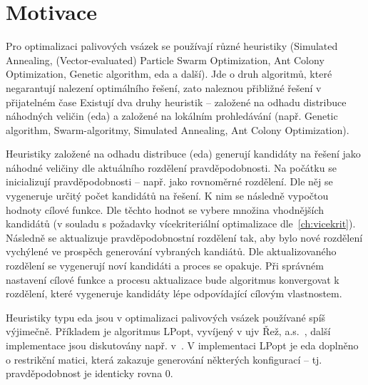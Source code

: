\section{Motivace}
\label{sec:motivace}
Pro optimalizaci palivových vsázek se používají různé heuristiky (Simulated Annealing, 
(Vector-evaluated) Particle Swarm Optimization, Ant Colony Optimization, 
Genetic algorithm, \ac{eda} a další). Jde o druh algoritmů, které negarantují nalezení optimálního 
řešení, zato naleznou přibližné řešení v přijatelném čase Existují dva druhy heuristik -- založené na odhadu 
distribuce náhodných veličin (\ac{eda}) a založené na lokálním prohledávání (např. Genetic algorithm, Swarm-algoritmy, 
Simulated Annealing, Ant Colony Optimization).

Heuristiky založené na odhadu distribuce (\ac{eda}) generují kandidáty na řešení jako náhodné veličiny dle aktuálního rozdělení pravděpodobnosti. 
Na počátku se inicializují pravděpodobnosti -- např. jako rovnoměrné rozdělení. Dle něj se vygeneruje určitý počet kandidátů na řešení. 
K nim se následně vypočtou hodnoty cílové funkce. Dle těchto hodnot se vybere množina vhodnějších kandidátů (v souladu s požadavky 
vícekriteriální optimalizace dle~\ref{ch:vicekrit}). 
Následně se aktualizuje pravděpodobnostní rozdělení tak, aby bylo nové rozdělení vychýlené 
ve prospěch generování vybraných kandiátů. Dle aktualizovaného rozdělení se vygenerují noví kandidáti a proces se opakuje. Při správném 
nastavení cílové funkce a procesu aktualizace bude algoritmus konvergovat k rozdělení, které vygeneruje kandidáty lépe odpovídající 
cílovým vlastnostem. 

Heuristiky typu \ac{eda} jsou v optimalizaci palivových vsázek používané spíš výjimečně. Příkladem je algoritmus LPopt, vyvíjený 
v \ac{ujv} Řež, a.s.~\cite{roubalik}, další implementace jsou diskutovány např. v~\cite{jiang, thakur}. 
% 
% 
V implementaci LPopt je \ac{eda} doplněno o restrikční matici, která zakazuje generování některých konfigurací -- tj. pravděpodobnost 
je identicky rovna 0. 

